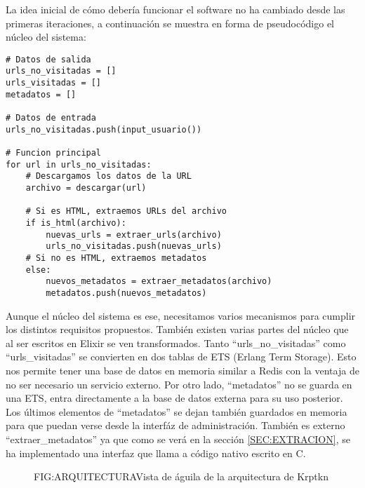 La idea inicial de cómo debería funcionar el software no ha cambiado desde las primeras iteraciones, a continuación se muestra en forma de pseudocódigo el núcleo del sistema:

\begin{verbatim}
# Datos de salida
urls_no_visitadas = []
urls_visitadas = []
metadatos = []

# Datos de entrada
urls_no_visitadas.push(input_usuario())

# Funcion principal
for url in urls_no_visitadas:
    # Descargamos los datos de la URL
    archivo = descargar(url)
    
    # Si es HTML, extraemos URLs del archivo
    if is_html(archivo):
        nuevas_urls = extraer_urls(archivo)
        urls_no_visitadas.push(nuevas_urls)
    # Si no es HTML, extraemos metadatos
    else:
        nuevos_metadatos = extraer_metadatos(archivo)
        metadatos.push(nuevos_metadatos)

\end{verbatim}

Aunque el núcleo del sistema es ese, necesitamos varios mecanismos para cumplir los distintos requisitos propuestos. También existen varias partes del núcleo que al ser escritos en Elixir se ven transformados. Tanto ``urls\_no\_visitadas'' como ``urls\_visitadas'' se convierten en dos tablas de ETS (Erlang Term Storage). Esto nos permite tener una base de datos en memoria similar a Redis con la ventaja de no ser necesario un servicio externo. Por otro lado, ``metadatos'' no se guarda en una ETS, entra directamente a la base de datos externa para su uso posterior. Los últimos elementos de ``metadatos'' se dejan también guardados en memoria para que puedan verse desde la interfáz de administración. También es externo ``extraer\_metadatos'' ya que como se verá en la sección \ref{SEC:EXTRACION}, se ha implementado una interfaz que llama a código nativo escrito en C.

\begin{figure}[Arquitectura general de Krptkn]{FIG:ARQUITECTURA}{Vista de águila de la arquitectura de Krptkn}
\end{figure}